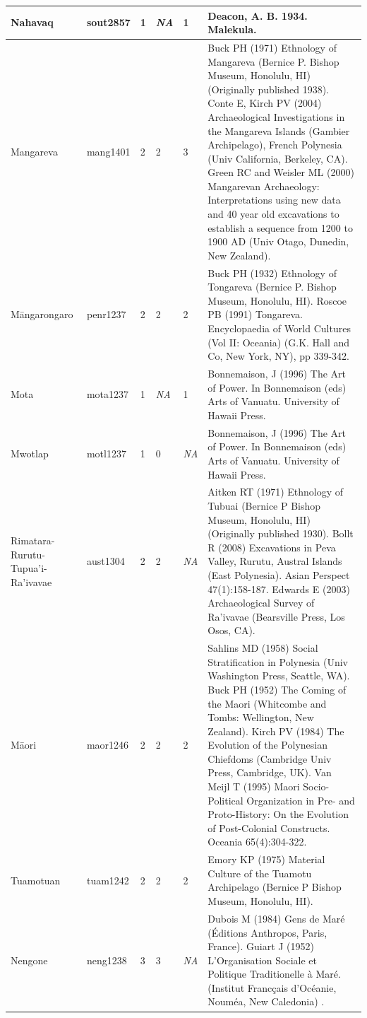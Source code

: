 \documentclass[draft,10pt]{article} %
\begin{document}
\begin{landscape}
\begin{longtable}{ | p{2cm}| p{2cm}| p{1.8cm}| p{1.8cm}| p{3cm}| p{9cm}| }
Nahavaq&sout2857&1&\emph{NA}&1&Deacon, A. B. 1934. Malekula.\\ \hline
Mangareva&mang1401&2&2&3&Buck PH (1971) Ethnology of Mangareva (Bernice P. Bishop Museum, Honolulu, HI) (Originally published 1938). Conte E, Kirch PV (2004) Archaeological Investigations in the Mangareva Islands (Gambier Archipelago), French Polynesia (Univ California, Berkeley, CA). Green RC and Weisler ML (2000) Mangarevan Archaeology: Interpretations using new data and 40 year old excavations to establish a sequence from 1200 to 1900 AD (Univ Otago, Dunedin, New Zealand). \\ \hline
Māngarongaro&penr1237&2&2&2&Buck PH (1932) Ethnology of Tongareva (Bernice P. Bishop Museum, Honolulu, HI). Roscoe PB (1991) Tongareva. Encyclopaedia of World Cultures (Vol II: Oceania) (G.K. Hall and Co, New York, NY), pp 339-342. \\ \hline
Mota&mota1237&1&\emph{NA}&1&Bonnemaison, J (1996) The Art of Power. In Bonnemaison (eds) Arts of Vanuatu. University of Hawaii Press.\\ \hline
Mwotlap&motl1237&1&0&\emph{NA}&Bonnemaison, J (1996) The Art of Power. In Bonnemaison (eds) Arts of Vanuatu. University of Hawaii Press.\\ \hline
﻿Rimatara-Rurutu-Tupua'i-Ra'ivavae&aust1304&2&2&\emph{NA}&Aitken RT (1971) Ethnology of Tubuai (Bernice P Bishop Museum, Honolulu, HI) (Originally published 1930). Bollt R (2008) Excavations in Peva Valley, Rurutu, Austral Islands (East Polynesia). Asian Perspect 47(1):158-187. Edwards E (2003) Archaeological Survey of Ra’ivavae (Bearsville Press, Los Osos, CA). \\ \hline
Māori&maor1246&2&2&2&Sahlins MD (1958) Social Stratification in Polynesia (Univ Washington Press, Seattle, WA). Buck PH (1952) The Coming of the Maori (Whitcombe and Tombs: Wellington, New Zealand). Kirch PV (1984) The Evolution of the Polynesian Chiefdoms (Cambridge Univ Press, Cambridge, UK). Van Meijl T (1995) Maori Socio-Political Organization in Pre- and Proto-History: On the Evolution of Post-Colonial Constructs. Oceania 65(4):304-322. \\ \hline
Tuamotuan&tuam1242&2&2&2&Emory KP (1975) Material Culture of the Tuamotu Archipelago (Bernice P Bishop Museum, Honolulu, HI).\\ \hline
Nengone&neng1238&3&3&\emph{NA}&﻿Dubois M (1984) Gens de Mar\'{e} (\'{E}ditions Anthropos, Paris, France). Guiart J (1952) L'Organisation Sociale et Politique Traditionelle \`{a} Mar\'{e}. (Institut Franc{\c c}ais d'Oc\'{e}anie, Noum\'{e}a, New Caledonia) . \\ \hline

\end{longtable}
\end{landscape}
\end{document}
